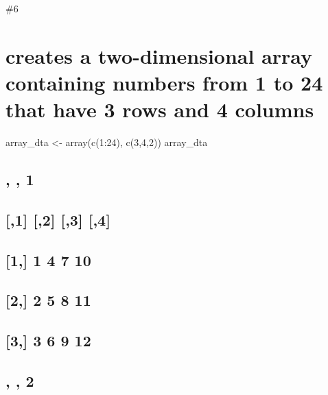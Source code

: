 \documentclass[
]{article}
\begin{document}
\#6

\hypertarget{creates-a-two-dimensional-array-containing-numbers-from-1-to-24-that-have-3-rows-and-4-columns}{%
\section{creates a two-dimensional array containing numbers from 1 to 24
that have 3 rows and 4
columns}\label{creates-a-two-dimensional-array-containing-numbers-from-1-to-24-that-have-3-rows-and-4-columns}}

array\_dta \textless- array(c(1:24), c(3,4,2)) array\_dta

\hypertarget{section}{%
\subsection{, , 1}\label{section}}

\hypertarget{section-1}{%
\subsection{}\label{section-1}}

\hypertarget{section-2}{%
\subsection{{[},1{]} {[},2{]} {[},3{]} {[},4{]}}\label{section-2}}

\hypertarget{section-3}{%
\subsection{{[}1,{]} 1 4 7 10}\label{section-3}}

\hypertarget{section-4}{%
\subsection{{[}2,{]} 2 5 8 11}\label{section-4}}

\hypertarget{section-5}{%
\subsection{{[}3,{]} 3 6 9 12}\label{section-5}}

\hypertarget{section-6}{%
\subsection{}\label{section-6}}

\hypertarget{section-7}{%
\subsection{, , 2}\label{section-7}}
\end{document}
